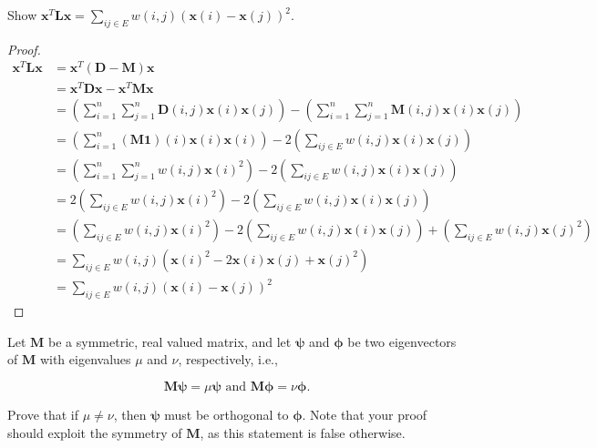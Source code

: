 \documentclass[11pt,letterpaper]{article}
\begin{document}
\begin{exercise} Show $\bm{x}^T\bm{L}\bm{x} = \sum_{ij \in E} w(i,j)(\bm{x}(i) - \bm{x}(j))^2$.
\end{exercise}

\begin{proof}
  \begin{align*}
    \bm{x}^T\bm{L}\bm{x} &= \bm{x}^T(\bm{D} - \bm{M})\bm{x}\\
    &= \bm{x}^T \bm{D}\bm{x} - \bm{x}^T \bm{M}\bm{x}\\
    &= \left(\sum_{i=1}^n \sum_{j=1}^n \bm{D}(i,j) \bm{x}(i) \bm{x}(j)\right)
    - \left(\sum_{i=1}^n \sum_{j=1}^n \bm{M}(i,j) \bm{x}(i) \bm{x}(j)\right)\\
    &= \left(\sum_{i=1}^n (\bm{M}\bm{1})(i) \bm{x}(i) \bm{x}(i)\right)
    - 2 \left(\sum_{ij \in E} w(i,j) \bm{x}(i) \bm{x}(j)\right)\\
    &= \left(\sum_{i=1}^n \sum_{j=1}^n w(i,j) \bm{x}(i)^2\right)
    - 2 \left(\sum_{ij \in E} w(i,j) \bm{x}(i) \bm{x}(j)\right)\\
    &= 2\left(\sum_{ij \in E} w(i,j) \bm{x}(i)^2\right)
    - 2 \left(\sum_{ij \in E} w(i,j) \bm{x}(i) \bm{x}(j)\right)\\
    &= \left(\sum_{ij \in E} w(i,j) \bm{x}(i)^2\right)
    - 2 \left(\sum_{ij \in E} w(i,j) \bm{x}(i) \bm{x}(j)\right)
    + \left(\sum_{ij \in E} w(i,j) \bm{x}(j)^2\right)\\
    &= \sum_{ij \in E} w(i,j) \left(\bm{x}(i)^2 - 2 \bm{x}(i) \bm{x}(j) + \bm{x}(j)^2\right)\\
    &= \sum_{ij \in E} w(i,j)(\bm{x}(i) - \bm{x}(j))^2
  \end{align*}
\end{proof}

\begin{exercise}
  Let $\bm{M}$ be a symmetric, real valued matrix, and let $\bm{\psi}$ and $\bm{\phi}$ be two eigenvectors of $\bm{M}$
  with eigenvalues $\mu$ and $\nu$, respectively, i.e.,

  $$\bm{M}\bm{\psi} = \mu \bm{\psi} \text{ and } \bm{M}\bm{\phi} = \nu \bm{\phi}.$$

  Prove that if $\mu \neq \nu$, then $\bm{\psi}$ must be orthogonal to $\bm{\phi}$.
  Note that your proof should exploit the symmetry of $\bm{M}$, as this statement is false otherwise.
\end{exercise}
\end{document}
